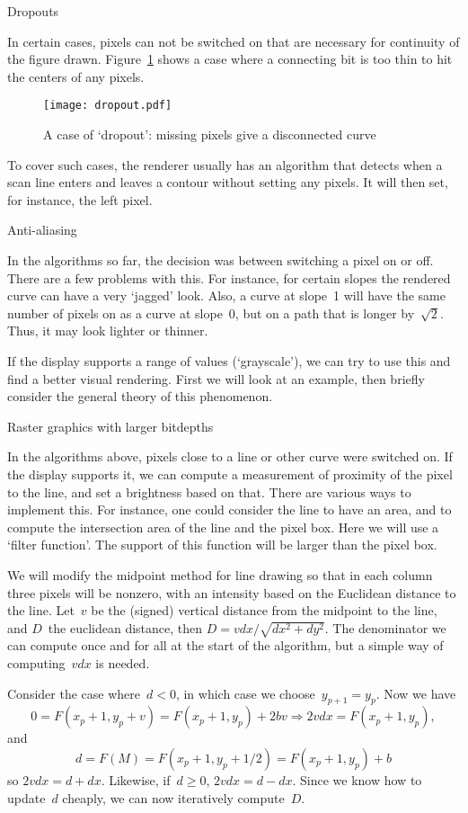  {Dropouts}

In certain cases, pixels can not be switched on that are necessary for
continuity of the figure drawn. Figure~\ref{fig:dropout} shows a case
where a connecting bit is too thin to hit the centers of any pixels.
\begin{figure}[ht]
\texttt{[image: dropout.pdf]}
\caption{A case of `dropout': missing pixels give a disconnected curve}
\label{fig:dropout}
\end{figure}
To cover such cases, the renderer usually has an algorithm that
detects when a scan line enters and leaves a contour without setting
any pixels. It will then set, for instance, the left pixel.

 {Anti-aliasing}

In the algorithms so far, the decision was between switching a pixel
on or off. There are a few problems with this. For instance, for
certain slopes the rendered curve can have a very `jagged' look. Also,
a curve at slope~1 will have the same number of pixels on as a curve
at slope~0, but on a path that is longer by~$\sqrt{2}$. Thus, it may
look lighter or thinner.

If the display supports a range of values (`grayscale'), we can try to
use this and find a better visual rendering. First we will look at an
example, then briefly consider the general theory of this phenomenon.

 {Raster graphics with larger bitdepths}

In the algorithms above, pixels close to a line or other curve were
switched on. If the display supports it, we can compute a
measurement of proximity of the pixel to the line, and set a
brightness based on that. There are various ways to implement
this. For instance, one could consider the line to have an area, and
to compute the intersection area of the line and the pixel box. Here
we will use a `filter function'. The support of
this function will be larger than the pixel box.

We will modify the midpoint method for line drawing so that in each
column three pixels will be nonzero, with an intensity based on the
Euclidean distance to the line. Let~$v$ be the (signed) vertical
distance from the midpoint to the line, and $D$~the euclidean
distance, then $D=vdx/\sqrt{dx^2+dy^2}$. The denominator we can
compute once and for all at the start of the algorithm, but a simple
way of computing~$vdx$ is needed.

Consider the case where~$d<0$, in which case we
choose~$y_{p+1}=y_p$. Now we have
\[ 0=F(x_p+1,y_p+v)=F(x_p+1,y_p)+2bv\Rightarrow 2vdx=F(x_p+1,y_p), \]
and
\[ d = F(M)=F(x_p+1,y_p+1/2)=F(x_p+1,y_p)+b \]
so $2vdx=d+dx$. Likewise, if~$d\geq0$, $2vdx=d-dx$. Since we know how
to update~$d$ cheaply, we can now iteratively compute~$D$.

